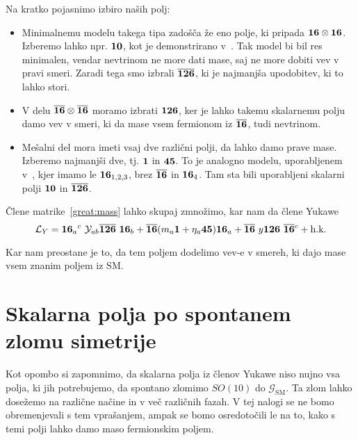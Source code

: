 Na kratko pojasnimo izbiro naših polj:
\begin{itemize}
	\item{Minimalnemu modelu takega tipa zadošča že eno polje, ki pripada $\mathbf{16}\otimes\mathbf{16}$.
		Izberemo lahko npr. $\mathbf{10}$, kot je demonstrirano v~\cite{babu}. Tak model bi bil res
		minimalen, vendar nevtrinom ne more dati mase, saj ne more dobiti vev v pravi smeri. Zaradi
		tega smo izbrali $\overline{\mathbf{126}}$, ki je najmanjša upodobitev, ki to lahko stori.}
	\item{V delu $\overline{\mathbf{16}}\otimes\overline{\mathbf{16}}$ moramo izbrati $\mathbf{126}$, ker je lahko takemu
		skalarnemu polju damo vev v smeri, ki da mase vsem fermionom iz $\overline{\mathbf{16}}$, tudi nevtrinom.}
	\item{Mešalni del mora imeti vsaj dve različni polji, da lahko damo prave mase. Izberemo
		najmanjši dve, tj. $\mathbf{1}$ in $\mathbf{45}$. To je analogno modelu, uporabljenem v~\cite{miha},
		kjer imamo le $\mathbf{16}_{1,2,3}$, brez $\overline{\mathbf{16}}$ in $\mathbf{16}_4$. Tam sta bili uporabljeni
		skalarni polji $\mathbf{10}$ in $\overline{\mathbf{126}}$.}
\end{itemize}
Člene matrike~\eqref{great:mass} lahko skupaj zmnožimo, kar nam da člene Yukawe
\begin{equation}
	\mathcal{L}_Y = \mathbf{16}_a{}^c\ \mathcal{Y}_{ab} \overline{\mathbf{126}}\ \mathbf{16}_b \notag
		+ \overline{\mathbf{16}} (m_a \mathbf{1} + \eta_a \mathbf{45})\mathbf{16}_a
		+ \overline{\mathbf{16}}\ y\mathbf{126}\ \overline{\mathbf{16}}{}^c + \text{h.k.}
\end{equation}

Kar nam preostane je to, da tem poljem dodelimo vev-e v smereh, ki dajo mase vsem znanim poljem
iz SM.

\section{Skalarna polja po spontanem zlomu simetrije}

Kot opombo si zapomnimo, da skalarna polja iz členov Yukawe niso nujno vsa polja, ki jih
potrebujemo, da spontano zlomimo $SO(10)$ do $\mathcal{G}_\text{SM}$. Ta zlom lahko dosežemo
na različne načine in v več različnih fazah. V tej nalogi se ne bomo obremenjevali s tem vprašanjem,
ampak se bomo osredotočili le na to, kako s temi polji lahko damo maso fermionskim poljem.

